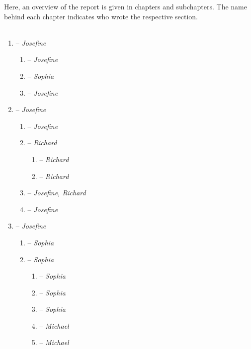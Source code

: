 Here, an overview of the report is given in chapters and subchapters. The name behind each chapter indicates who wrote the respective section.
\\
\\
\begin{enumerate}
\item {} -- \textit{Josefine}
	\begin{enumerate}[label*=\arabic*.]
	\item {} -- \textit{Josefine}
	\item {} -- \textit{Sophia}
	\item {} -- \textit{Josefine}
	\end{enumerate}
\item {} -- \textit{Josefine}
	\begin{enumerate}[label*=\arabic*.]
	\item {} -- \textit{Josefine}
	\item {} -- \textit{Richard}
		\begin{enumerate}[label*=\arabic*.]
		\item {} -- \textit{Richard}
		\item {} -- \textit{Richard}
		\end{enumerate}
	\item {} -- \textit{Josefine, Richard}
	\item {} -- \textit{Josefine}
	\end{enumerate}
\item {} -- \textit{Josefine}
	\begin{enumerate}[label*=\arabic*.]
	\item {} -- \textit{Sophia}
	\item {} -- \textit{Sophia}
		\begin{enumerate}[label*=\arabic*.]
		\item {} -- \textit{Sophia}
		\item {} -- \textit{Sophia}
		\item {} -- \textit{Sophia}
		\item {} -- \textit{Michael}
		\item {} -- \textit{Michael}

\end{enumerate}
\end{enumerate}
\end{enumerate}
